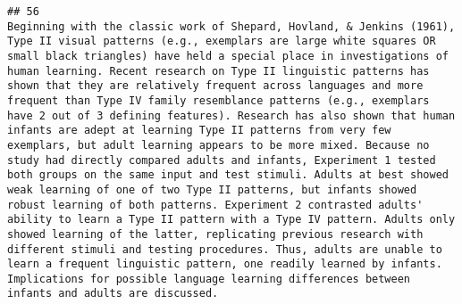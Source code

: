 \documentclass[
  english,
  man]{apa6}
\begin{document}
\begin{verbatim}
## 56                                                                                                                                                                                                                                                                                                                                                                                                                                                                                                                                                                                                                                                                                                                                                                                                                                                                                                                                                                                                                                                                                                                                                                                                                                                                                                                                                                         Beginning with the classic work of Shepard, Hovland, & Jenkins (1961), Type II visual patterns (e.g., exemplars are large white squares OR small black triangles) have held a special place in investigations of human learning. Recent research on Type II linguistic patterns has shown that they are relatively frequent across languages and more frequent than Type IV family resemblance patterns (e.g., exemplars have 2 out of 3 defining features). Research has also shown that human infants are adept at learning Type II patterns from very few exemplars, but adult learning appears to be more mixed. Because no study had directly compared adults and infants, Experiment 1 tested both groups on the same input and test stimuli. Adults at best showed weak learning of one of two Type II patterns, but infants showed robust learning of both patterns. Experiment 2 contrasted adults' ability to learn a Type II pattern with a Type IV pattern. Adults only showed learning of the latter, replicating previous research with different stimuli and testing procedures. Thus, adults are unable to learn a frequent linguistic pattern, one readily learned by infants. Implications for possible language learning differences between infants and adults are discussed.

\end{verbatim}
\end{document}
